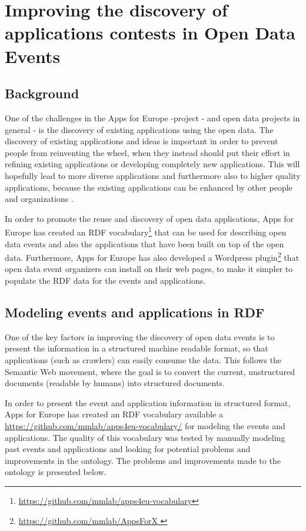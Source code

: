 \section{Improving the discovery of applications contests in Open Data Events}
\label{sec:contests}


\subsection{Background}
\label{sec:backcontest}
One of the challenges in the Apps for Europe -project - and open data projects in general - is the discovery of existing applications using the open data. The discovery of existing applications and ideas is important in order to prevent people from reinventing the wheel, when they instead should put their effort in refining existing applications or developing completely new applications. This will hopefully lead to more diverse applications and furthermore also to higher quality applications, because the existing applications can be enhanced by other people and organizations \cite{apps4eu}. 

In order to promote the reuse and discovery of open data applications, Apps for Europe has created an RDF vocabulary\footnote{\url{https://github.com/mmlab/apps4eu-vocabulary}}  that can be used for describing open data events and also the applications that have been built on top of the open data. Furthermore, Apps for Europe has also developed a Wordpress plugin\footnote{\url{https://github.com/mmlab/AppsForX }}  that open data event organizers can install on their web pages, to make it simpler to populate the RDF data for the events and applications.


\subsection{Modeling events and applications in RDF}
\label{sec:modeleventsapps}

One of the key factors in improving the discovery of open data events is to present the information in a structured machine readable format, so that applications (such as crawlers) can easily consume the data. This follows the Semantic Web movement, where the goal is to convert the current, unstructured documents (readable by humans) into structured documents.

In order to present the event and application information in structured format, Apps for Europe has created an RDF vocabulary available a \url{https://github.com/mmlab/apps4eu-vocabulary/} for modeling the events and applications. The quality of this vocabulary was tested by manually modeling past events  and applications and looking for potential problems and improvements in the ontology. The problems and improvements made to the ontology is presented below.

